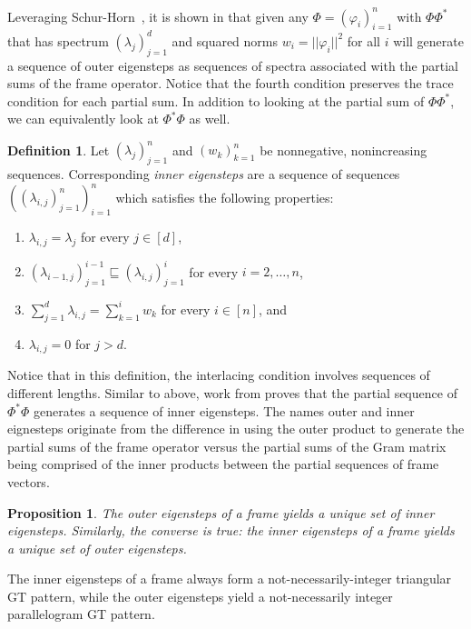 \documentclass[10pt]{article}
\theoremstyle{plain}
\newtheorem{prop}[thm]{Proposition}
\theoremstyle{definition}
\newtheorem{definition}[thm]{Definition}
\renewcommand{\phi}{\varphi}
\newcommand{\frameop}{\Phi\Phi^\ast}
\newcommand{\gram}{\Phi^\ast\Phi}
\begin{document}
Leveraging Schur-Horn~\cite{Schurbackground, Hornbackground}, it is shown in \cite{cfmconstructingfiniteframes} that given any $\Phi = (\phi_i)^n_{i=1}$ with $\frameop$ that has spectrum $(\lambda_j)^d_{j=1}$ and squared norms $ w_i = ||\phi_i||^2$ for all $i$ will generate a sequence of outer eigensteps as sequences of spectra associated with the partial sums of the frame operator. Notice that the fourth condition preserves the trace condition for each partial sum. In addition to looking at the partial sum of $\frameop$, we can equivalently look at $\gram$ as well.

\begin{definition}\label{innerdef}
Let $(\lambda_j)^n_{j=1}$ and $(w_k)^n_{k=1}$ be nonnegative, nonincreasing sequences. Corresponding \emph{inner eigensteps} are a sequence of sequences $((\lambda_{i,j})^n_{j=1})^n_{i=1}$ which satisfies the following properties: 
\begin{enumerate}
\item $\lambda_{i,j}=\lambda_j$ for every $j\in [d]$,
\item $(\lambda_{i-1,j})^{i-1}_{j=1} \sqsubseteq (\lambda_{i,j})^i_{j=1}$ for every $i = 2, \dots, n$,
\item $\sum^d_{j=1} \lambda_{i,j} =  \sum^i_{k=1}w_k$ for every $i\in [n]$, and
\item $\lambda_{i,j} = 0$ for $j > d$.
\end{enumerate}
\end{definition}

Notice that in this definition, the interlacing condition involves sequences of different lengths. Similar to above, work from \cite{cfpconstructingselfadjoint} proves that the partial sequence of $\gram$ generates a sequence of inner eigensteps. The names outer and inner eignesteps originate from the difference in using the outer product to generate the partial sums of the frame operator versus the partial sums of the Gram matrix being comprised of the inner products between the partial sequences of frame vectors.

\begin{prop}
The outer eigensteps of a frame yields a unique set of inner eigensteps. Similarly, the converse is true: the inner eigensteps of a frame yields a unique set of outer eigensteps.
\end{prop}

The inner eigensteps of a frame always form a not-necessarily-integer triangular GT pattern, while the outer eigensteps yield a not-necessarily integer parallelogram GT pattern.
\end{document}
